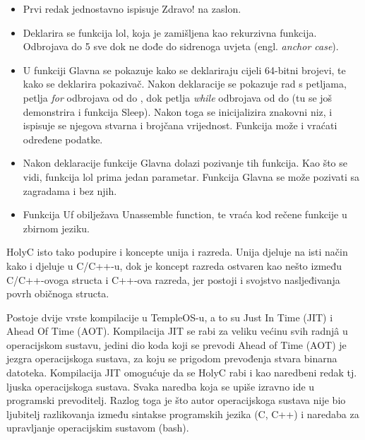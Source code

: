 \documentclass{foi}
\begin{document}
\begin{itemize}
    \item Prvi redak jednostavno ispisuje {\selectfont Zdravo!} na zaslon.

    \item Deklarira se funkcija {\selectfont lol}, koja je zamišljena kao rekurzivna funkcija. Odbrojava do 5 sve dok ne dođe do sidrenoga uvjeta (engl. \emph{anchor case}).

    \item U funkciji {\selectfont Glavna} se pokazuje kako se deklariraju cijeli 64-bitni brojevi, te kako se deklarira pokazivač. Nakon deklaracije se pokazuje rad s petljama, petlja \emph{for} odbrojava od {} do {}, dok petlja \emph{while} odbrojava od {} do {} (tu se još demonstrira i funkcija {\selectfont Sleep}). Nakon toga se inicijalizira znakovni niz, i ispisuje se njegova stvarna i brojčana vrijednost. Funkcija može i vraćati određene podatke.

    \item Nakon deklaracije funkcije {\selectfont Glavna} dolazi pozivanje tih funkcija. Kao što se vidi, funkcija {\selectfont lol} prima jedan parametar. Funkcija {\selectfont Glavna} se može pozivati sa zagradama i bez njih.

    \item Funkcija {\selectfont Uf} obilježava {\selectfont Unassemble function}, te vraća kod rečene funkcije u zbirnom jeziku.
\end{itemize}

HolyC isto tako podupire i koncepte unija i razreda. Unija djeluje na isti način kako i djeluje u C/C++-u, dok je koncept razreda ostvaren kao nešto između C/C++-ovoga {\selectfont structa} i C++-ova razreda, jer postoji i svojstvo nasljeđivanja povrh običnoga {\selectfont structa}.

Postoje dvije vrste kompilacije u TempleOS-u, a to su Just In Time (JIT) i Ahead Of Time (AOT). Kompilacija JIT se rabi za veliku većinu svih radnjâ u operacijskom sustavu, jedini dio koda koji se prevodi Ahead of Time (AOT) je jezgra operacijskoga sustava, za koju se prigodom prevođenja stvara binarna datoteka. Kompilacija JIT omogućuje da se HolyC rabi i kao naredbeni redak tj. ljuska operacijskoga sustava. Svaka naredba koja se upiše izravno ide u programski prevoditelj. Razlog toga je što autor operacijskoga sustava nije bio ljubitelj razlikovanja između sintakse programskih jezika (C, C++) i naredaba za upravljanje operacijskim sustavom ({\selectfont bash}).
\end{document}
